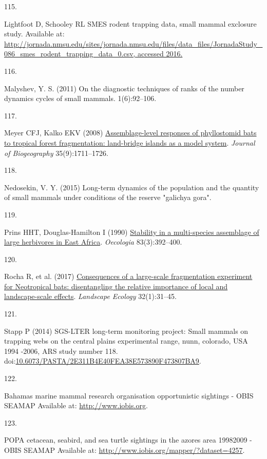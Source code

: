 \documentclass{article}
\newlength{\cslhangindent}
\newlength{\csllabelwidth}
\newlength{\cslentryspacingunit} %
\newenvironment{CSLReferences}[2] %
 {%
  \setlength{\parindent}{0pt}
  \ifodd #1
  \let\oldpar\par
  \def\par{\hangindent=\cslhangindent\oldpar}
  \fi
  \setlength{\parskip}{#2\cslentryspacingunit}
 }%
 {}
\newcommand{\CSLLeftMargin}[1]{\parbox[t]{\csllabelwidth}{#1}}
\newcommand{\CSLRightInline}[1]{\parbox[t]{\linewidth - \csllabelwidth}{#1}\break}
\begin{document}
\begin{CSLReferences}{0}{0}
\leavevmode{}%
\CSLLeftMargin{115. }%
\CSLRightInline{Lightfoot D, Schooley RL SMES rodent trapping data,
small mammal exclosure study. Available at:
\href{http://jornada.nmsu.edu/sites/jornada.nmsu.edu/files/data_files/JornadaStudy_086_smes_rodent_trapping_data_0.csv,\%20accessed\%202016.}{http://jornada.nmsu.edu/sites/jornada.nmsu.edu/files/data\_files/JornadaStudy\_086\_smes\_rodent\_trapping\_data\_0.csv,
accessed 2016.}}

\leavevmode{}%
\CSLLeftMargin{116. }%
\CSLRightInline{Malyshev, Y. S. (2011) On the diagnostic techniques of
ranks of the number dynamics cycles of small mammals. 1(6):92--106.}

\leavevmode{}%
\CSLLeftMargin{117. }%
\CSLRightInline{Meyer CFJ, Kalko EKV (2008)
\href{https://doi.org/10.1111/j.1365-2699.2008.01916.x}{Assemblage-level
responses of phyllostomid bats to tropical forest fragmentation:
land-bridge islands as a model system}. \emph{Journal of Biogeography}
35(9):1711--1726.}

\leavevmode{}%
\CSLLeftMargin{118. }%
\CSLRightInline{Nedosekin, V. Y. (2015) Long-term dynamics of the
population and the quantity of small mammals under conditions of the
reserve {"}galichya gora{"}.}

\leavevmode{}%
\CSLLeftMargin{119. }%
\CSLRightInline{Prins HHT, Douglas-Hamilton I (1990)
\href{https://doi.org/10.1007/BF00317566}{Stability in a multi-species
assemblage of large herbivores in East Africa}. \emph{Oecologia}
83(3):392--400.}

\leavevmode{}%
\CSLLeftMargin{120. }%
\CSLRightInline{Rocha R, et al. (2017)
\href{https://doi.org/10.1007/s10980-016-0425-3}{Consequences of a
large-scale fragmentation experiment for Neotropical bats: disentangling
the relative importance of local and landscape-scale effects}.
\emph{Landscape Ecology} 32(1):31--45.}

\leavevmode{}%
\CSLLeftMargin{121. }%
\CSLRightInline{Stapp P (2014) SGS-LTER long-term monitoring project:
Small mammals on trapping webs on the central plains experimental range,
nunn, colorado, USA 1994 -2006, ARS study number 118.
doi:\href{https://doi.org/10.6073/PASTA/2E311B4E40FEA38E573890F473807BA9}{10.6073/PASTA/2E311B4E40FEA38E573890F473807BA9}.}

\leavevmode{}%
\CSLLeftMargin{122. }%
\CSLRightInline{Bahamas marine mammal research organisation
opportunistic sightings - OBIS SEAMAP Available at:
\url{http://www.iobis.org}.}

\leavevmode{}%
\CSLLeftMargin{123. }%
\CSLRightInline{POPA cetacean, seabird, and sea turtle sightings in the
azores area 1998{\textendash}2009 - OBIS SEAMAP Available at:
\url{http://www.iobis.org/mapper/?dataset=4257}.}

\end{CSLReferences}



\end{document}
